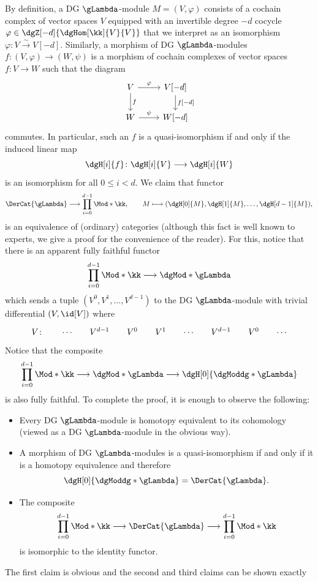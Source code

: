 \documentclass[a4paper]{amsart}
\begin{document}
By definition, a DG $\gLambda$-module $M=(V,\varphi)$ consists of a cochain
complex of vector spaces $V$ equipped with an invertible degree $-d$ cocycle
$\varphi\in\dgZ[-d]{\dgHom[\kk]{V}{V}}$ that we interpret as an isomorphism
$\varphi\colon V\stackrel{\sim}{\to} V[-d]$. Similarly, a morphism of DG
$\gLambda$-modules $f\colon(V,\varphi)\to(W,\psi)$ is a morphism of cochain
complexes of vector spaces $f\colon V\to W$ such that the diagram
\[
  \begin{tikzcd}
    V\dar{f}\rar{\varphi}&V[-d]\dar{f[-d]}\\
    W\rar{\psi}&W[-d]
  \end{tikzcd}
\]
commutes. In particular, such an $f$ is a quasi-isomorphism if and only if the
induced linear map
\[
  \dgH[i]{f}\colon\dgH[i]{V}\longrightarrow\dgH[i]{W}
\]
is an isomorphism for all $0\leq i<d$. We claim that functor
\[
  \DerCat{\gLambda}\longrightarrow\prod_{i=0}^{d-1}\Mod*{\kk},\qquad
  M\longmapsto(\dgH[0]{M},\dgH[1]{M},\dots,\dgH[d-1]{M}),
\]
is an equivalence of (ordinary) categories (although this fact is well known to
experts, we give a proof for the convenience of the reader). For this, notice
that there is an apparent fully faithful functor
\[
  \prod_{i=0}^{d-1}\Mod*{\kk}\longrightarrow\dgMod*{\gLambda}
\]
which sends a tuple $(V^0,V^1,\dots,V^{d-1})$ to the DG $\gLambda$-module with trivial differential
$(V,\id[V])$ where
\[
  \begin{tikzcd}[column sep=small]
    V\colon&\cdots&V^{d-1}&V^0&V^1&\cdots&V^{d-1}&V^0&\cdots
  \end{tikzcd}
\]
Notice that the composite
\[
  \prod_{i=0}^{d-1}\Mod*{\kk}\longrightarrow\dgMod*{\gLambda}\longrightarrow\dgH[0]{\dgModdg*{\gLambda}}
\]
is also fully faithful. To complete the proof, it is enough to observe the following:
\begin{itemize}
\item Every DG $\gLambda$-module is homotopy equivalent to its cohomology
  (viewed as a DG $\gLambda$-module in the obvious way).
\item A morphism of DG $\gLambda$-modules is a quasi-isomorphism if and only if
  it is a homotopy equivalence and therefore
  \[
    \dgH[0]{\dgModdg*{\gLambda}}=\DerCat{\gLambda}.
  \]
\item The composite
  \[
    \prod_{i=0}^{d-1}\Mod*{\kk}\longrightarrow\DerCat{\gLambda}\longrightarrow\prod_{i=0}^{d-1}\Mod*{\kk}
  \]
  is isomorphic to the identity functor.
\end{itemize}
The first claim is obvious and the second and third claims can be shown exactly
\end{document}
